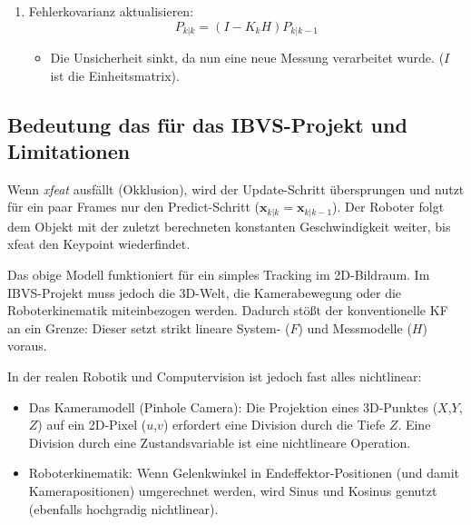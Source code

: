 \documentclass{article}
\begin{document}
\begin{enumerate}
\begin{equation}
            \mathbf{x}_{k|k} = \mathbf{x}_{k|k-1} + K_k \tilde{\mathbf{y}}_k
        \end{equation}
        \begin{itemize}
            \item $\mathbf{x}_{k|k}$: Das ist dein final geglätteter Wert, den du an deine IBVS-Regelung weitergibst.
        \end{itemize}
    \item Fehlerkovarianz aktualisieren:
        \begin{equation}
            P_{k|k} = (I - K_k H) P_{k|k-1}
        \end{equation}
        \begin{itemize}
            \item Die Unsicherheit sinkt, da nun eine neue Messung verarbeitet wurde. ($I$ ist die Einheitsmatrix).
        \end{itemize}
\end{enumerate}




\subsection{Bedeutung das für das IBVS-Projekt und Limitationen}
Wenn \textit{xfeat} ausfällt (Okklusion), wird der Update-Schritt übersprungen und nutzt für ein paar Frames nur den Predict-Schritt ($\mathbf{x}_{k|k} = \mathbf{x}_{k|k-1}$). Der Roboter folgt dem Objekt mit der zuletzt berechneten konstanten Geschwindigkeit weiter, bis xfeat den Keypoint wiederfindet.

Das obige Modell funktioniert für ein simples Tracking im 2D-Bildraum. Im IBVS-Projekt muss jedoch die 3D-Welt, die Kamerabewegung oder die Roboterkinematik miteinbezogen werden. Dadurch stößt der konventionelle KF an ein Grenze: Dieser setzt strikt lineare System- ($F$) und Messmodelle ($H$) voraus.

In der realen Robotik und Computervision ist jedoch fast alles nichtlinear:
\begin{itemize}
    \item Das Kameramodell (Pinhole Camera): Die Projektion eines 3D-Punktes ($X$,$Y$,$Z$) auf ein 2D-Pixel ($u$,$v$) erfordert eine Division durch die Tiefe $Z$. Eine Division durch eine Zustandsvariable ist eine nichtlineare Operation.
    \item Roboterkinematik: Wenn Gelenkwinkel in Endeffektor-Positionen (und damit Kamerapositionen) umgerechnet werden, wird Sinus und Kosinus genutzt (ebenfalls hochgradig nichtlinear).
\end{itemize}
\end{document}
